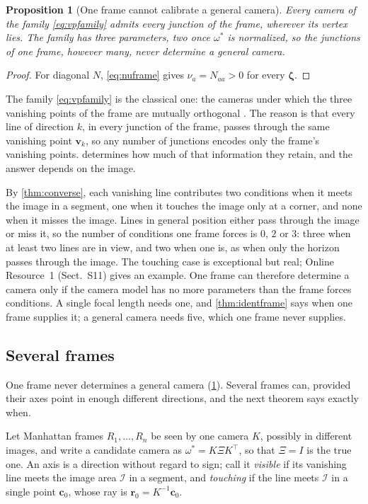 \documentclass[pdflatex,sn-mathphys-num,iicol]{sn-jnl}
\newcommand{\vr}{\mathbf{r}}
\newcommand{\vc}{\mathbf{c}}
\newcommand{\vv}{\mathbf{v}}
\newcommand{\OR}{Online Resource~1}
\theoremstyle{thmstyleone}
\newtheorem{proposition}[theorem]{Proposition}
\theoremstyle{thmstylethree}
\theoremstyle{thmstyletwo}
\begin{document}
\begin{proposition}[One frame cannot calibrate a general camera]\label{prop:oneframe}
Every camera of the family \eqref{eq:vpfamily} admits every junction of the frame, wherever its vertex lies. The family has three parameters, two once $\omega^{*}$ is normalized, so the junctions of one frame, however many, never determine a general camera.
\end{proposition}
\begin{proof}
For diagonal $N$, \eqref{eq:nuframe} gives $\nu_a=N_{aa}>0$ for every $\boldsymbol\zeta$.
\end{proof}

The family \eqref{eq:vpfamily} is the classical one: the cameras under which the three vanishing points of the frame are mutually orthogonal \citep{hartley2004}. The reason is that every line of direction $k$, in every junction of the frame, passes through the same vanishing point $\vv_k$, so any number of junctions encodes only the frame's vanishing points.  determines how much of that information they retain, and the answer depends on the image. 

By \cref{thm:converse}, each vanishing line contributes two conditions when it meets the image in a segment, one when it touches the image only at a corner, and none when it misses the image. Lines in general position either pass through the image or miss it, so the number of conditions one frame forces is $0$, $2$ or $3$: three when at least two lines are in view, and two when one is, as when only the horizon passes through the image. The touching case is exceptional but real; \OR{} (Sect.~S11) gives an example. One frame can therefore determine a camera only if the camera model has no more parameters than the frame forces conditions. A single focal length needs one, and \cref{thm:identframe} says when one frame supplies it; a general camera needs five, which one frame never supplies.

\subsection{Several frames}\label{sec:frames}

One frame never determines a general camera (\cref{prop:oneframe}). Several frames can, provided their axes point in enough different directions, and the next theorem says exactly when.

Let Manhattan frames $R_1,\dots,R_n$ be seen by one camera $K$, possibly in different images, and write a candidate camera as $\omega^{*}=K\Xi K^{\top}$, so that $\Xi=I$ is the true one. An axis is a direction without regard to sign; call it \emph{visible} if its vanishing line meets the image area $\mathcal I$ in a segment, and \emph{touching} if the line meets $\mathcal I$ in a single point $\vc_0$, whose ray is $\vr_0=K^{-1}\vc_0$.
\end{document}
